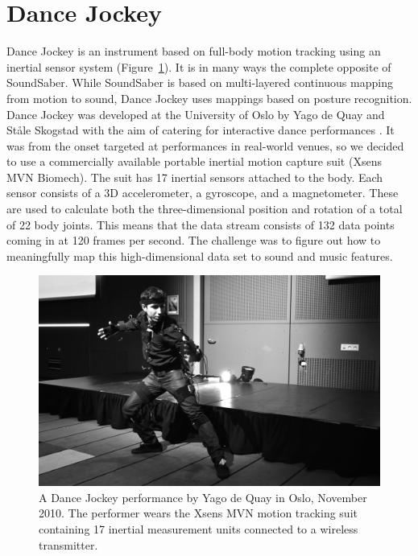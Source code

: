 \section{Dance Jockey}

Dance Jockey is an instrument based on full-body motion tracking using an inertial sensor system (Figure~\ref{fig:Mostra}). It is in many ways the complete opposite of SoundSaber. While SoundSaber is based on multi-layered continuous mapping from motion to sound, Dance Jockey uses mappings based on posture recognition. Dance Jockey was developed at the University of Oslo by Yago de Quay and Ståle Skogstad with the aim of catering for interactive dance performances \citep{skogstad_osc_2011,de_quay_dance_2011}. It was from the onset targeted at performances in real-world venues, so we decided to use a commercially available portable inertial motion capture suit (Xsens MVN Biomech). The suit has 17 inertial sensors attached to the body. Each sensor consists of a 3D accelerometer, a gyroscope, and a magnetometer. These are used to calculate both the three-dimensional position and rotation of a total of 22 body joints. This means that the data stream consists of 132 data points coming in at 120 frames per second. The challenge was to figure out how to meaningfully map this high-dimensional data set to sound and music features.

\begin{figure}[tbp]
\includegraphics[width=1\columnwidth]{figures/75-dancejockey.jpg}
\caption{A Dance Jockey performance by Yago de Quay in Oslo, November 2010. The performer wears the Xsens MVN motion tracking suit containing 17 inertial measurement units connected to a wireless transmitter.}
\label{fig:Mostra}
\end{figure}

